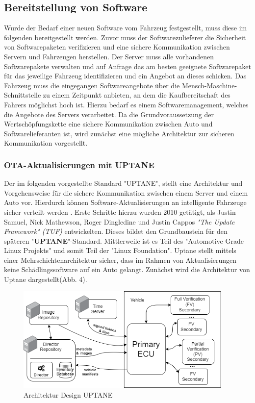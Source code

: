 \subsection{Bereitstellung von Software}\label{bereitstellung}
Wurde der Bedarf einer neuen Software vom Fahrzeug festgestellt, muss diese im folgenden bereitgestellt werden. Zuvor muss der Softwarezulieferer die Sicherheit von Softwarepaketen verifizieren und eine sichere Kommunikation zwischen Servern und Fahrzeugen herstellen. Der Server muss alle vorhandenen Softwarepakete verwalten und auf Anfrage das am besten geeignete Softwarepaket für das jeweilige Fahrzeug identifizieren und ein Angebot an dieses schicken. Das Fahrzeug muss die eingegangen Softwareangebote über die Mensch-Maschine-Schnittstelle zu einem Zeitpunkt anbieten, an dem die Kaufbereitschaft des Fahrers möglichst hoch ist. Hierzu bedarf es einem Softwaremanagement, welches die Angebote des Servers verarbeitet. Da die Grundvoraussetzung der Wertschöpfungskette eine sichere Kommunikation zwischen Auto und Softwarelieferanten ist, wird zunächst eine mögliche Architektur zur sicheren Kommunikation vorgestellt.

\subsubsection{OTA-Aktualisierungen mit UPTANE}\label{3.1}\label{uptane}
Der im folgenden vorgestellte Standard "UPTANE", stellt eine Architektur und Vorgehensweise für die sichere Kommunikation zwischen einem Server und einem Auto 
vor. Hierdurch können Software-Aktualisierungen an intelligente Fahrzeuge sicher verteilt werden \cite{uptane}. Erste Schritte hierzu wurden 2010 getätigt, als Justin Samuel, Nick Mathewson, Roger Dingledine und Justin Cappos \textit{"The Update Framework" (TUF)} entwickelten. Dieses bildet den Grundbaustein für den späteren "\textbf{UPTANE}"-Standard. Mittlerweile ist es Teil des "Automotive Grade Linux Projekts" und somit Teil der "Linux Foundation". Uptane stellt mittels einer Mehrschichtenarchitektur sicher, dass im Rahmen von Aktualisierungen keine Schädlingssoftware auf ein Auto gelangt. Zunächst wird die Architektur von Uptane dargestellt(Abb. 4).

\begin{figure}[H]
  \begin{center}
    \includegraphics[width=0.95\textwidth]{../pictures/meta_model_fs-uptane-original.png}
  \end{center}
  \caption{Architektur Design UPTANE \cite{uptane}}
\end{figure}

